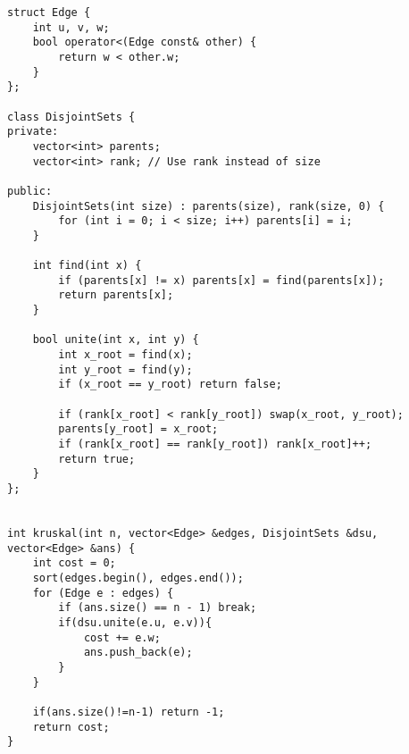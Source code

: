 \documentclass{article}
\begin{document}
\begin{lstlisting}
struct Edge {
    int u, v, w;
    bool operator<(Edge const& other) {
        return w < other.w;
    }
};
 
class DisjointSets {
private:
    vector<int> parents;
    vector<int> rank; // Use rank instead of size
 
public:
    DisjointSets(int size) : parents(size), rank(size, 0) {
        for (int i = 0; i < size; i++) parents[i] = i;
    }
 
    int find(int x) {
        if (parents[x] != x) parents[x] = find(parents[x]);
        return parents[x];
    }
 
    bool unite(int x, int y) {
        int x_root = find(x);
        int y_root = find(y);
        if (x_root == y_root) return false;
 
        if (rank[x_root] < rank[y_root]) swap(x_root, y_root);
        parents[y_root] = x_root;
        if (rank[x_root] == rank[y_root]) rank[x_root]++;
        return true;
    }
};
 
 
int kruskal(int n, vector<Edge> &edges, DisjointSets &dsu, vector<Edge> &ans) {
    int cost = 0;
    sort(edges.begin(), edges.end());
    for (Edge e : edges) {
        if (ans.size() == n - 1) break;
        if(dsu.unite(e.u, e.v)){
            cost += e.w;
            ans.push_back(e);
        }
    }
 
    if(ans.size()!=n-1) return -1;
    return cost;
}
\end{lstlisting}
\end{document}
